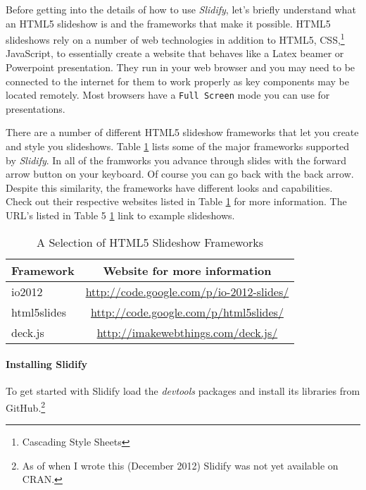 Before getting into the details of how to use \emph{Slidify}, let's briefly understand what an HTML5 slideshow is and the frameworks that make it possible. HTML5 slideshows rely on a number of web technologies in addition to HTML5, CSS,\footnote{Cascading Style Sheets} JavaScript, to essentially create a website that behaves like a Latex beamer or Powerpoint presentation. They run in your web browser and you may need to be connected to the internet for them to work properly as key components may be located remotely. Most browsers have a \texttt{Full Screen} mode you can use for presentations. 

There are a number of different HTML5 slideshow frameworks that let you create and style you slideshows. Table \ref{SlideshowFrameworks} lists some of the major frameworks supported by \emph{Slidify}. In all of the framworks you advance through slides with the forward arrow button on your keyboard. Of course you can go back with the back arrow. Despite this similarity, the frameworks have different looks and capabilities. Check out their respective websites listed in Table \ref{SlideshowFrameworks} for more information. The URL's listed in Table 5 \ref{SlideshowFrameworks} link to example slideshows.

\begin{table}
	\caption{A Selection of HTML5 Slideshow Frameworks}
	\label{SlideshowFrameworks}
	\begin{center}
	\begin{tabular}{l c}
		\hline
		Framework & Website for more information \\[0.25cm]
		\hline\hline
		io2012 & \url{http://code.google.com/p/io-2012-slides/} \\[0.25cm]
		html5slides & \url{http://code.google.com/p/html5slides/} \\[0.25cm]
		deck.js &  \url{http://imakewebthings.com/deck.js/} \\[0.25cm]
	\end{tabular}
	\end{center}
\end{table}

\paragraph{Installing Slidify}

To get started with Slidify load the \emph{devtools} packages and install its libraries from GitHub.\footnote{As of when I wrote this (December 2012) Slidify was not yet available on CRAN.}

